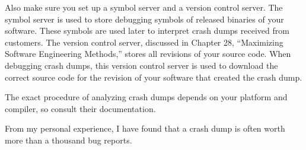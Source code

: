 Also make sure you set up a symbol server and a version control server. The symbol server is used to store debugging symbols of released binaries of your software. These symbols are used later to interpret crash dumps received from customers. The version control server, discussed in Chapter 28, “Maximizing Software Engineering Methods,” stores all revisions of your source code. When debugging crash dumps, this version control server is used to download the correct source code for the revision of your software that created the crash dump.

The exact procedure of analyzing crash dumps depends on your platform and compiler, so consult their documentation.

From my personal experience, I have found that a crash dump is often worth more than a thousand bug reports.

















